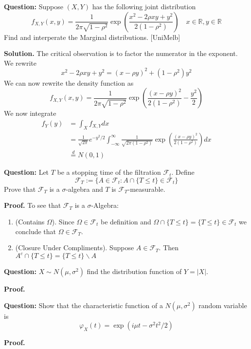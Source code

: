 \documentclass{article}
\begin{document}
\begin{tcolorbox}[colframe=black,colback=gray!5,boxrule=0.5pt]
\textbf{Question:} Suppose $(X,Y)$ has the following joint distribution
$$f_{X,Y}(x,y) = \frac{1}{2\pi\sqrt{1-\rho^2}}\exp\left(\frac{x^2 - 2\rho xy + y^2}{2(1-\rho^2)}\right)\quad x\in\mathbb{R},y\in\mathbb{R}$$
Find and interperate the Marginal distributions. [UniMelb]
\end{tcolorbox}
\textbf{Solution.} The critical observation is to factor the numerator in the exponent. We rewrite $$x^2 -2\rho xy + y^2 = (x-\rho y)^2 + (1-\rho^2)y^2$$
We can now rewrite the density function as
$$f_{X,Y}(x,y) = \frac{1}{2\pi\sqrt{1-\rho^2}}\exp\left(\frac{(x-\rho y)^2}{2(1-\rho^2)} - \frac{y^2}{2}\right)$$
We now integrate
\begin{align*}
    f_Y(y) &= \int_{X} f_{X,Y}dx \\
    &= \frac{1}{\sqrt{2\pi}}e^{-y^2/2}\int_{-\infty}^{\infty} \frac{1}{\sqrt{2\pi(1-\rho^2)}}\exp\left(\frac{(x-\rho y)^2}{2(1-\rho^2)}\right)dx \\
    &\stackrel{d}{=} N(0,1)
\end{align*} 

\begin{tcolorbox}[colframe=black,colback=gray!5,boxrule=0.5pt]
\textbf{Question:} Let $T$ be a stopping time of the filtration $\mathcal{F}_t$. Define 
$$\mathcal{F}_T := \{A\in\mathcal{F}_t : A\cap\{T\leq t\}\in\mathcal{F}_t\}$$
Prove that $\mathcal{F}_T$ is a $\sigma$-algebra and $T$ is $\mathcal{F}_T$-measurable.
\end{tcolorbox}
\textbf{Proof.} To see that $\mathcal{F}_T$ is a $\sigma$-Algebra: 
\begin{enumerate}
    \item (Contains $\Omega$). Since $\Omega\in\mathcal{F}_t$ be definition and $\Omega \cap\{T\leq t\} = \{T\leq t\}\in\mathcal{F}_t$ we conclude that $\Omega\in\mathcal{F}_T$. 
    \item (Closure Under Compliments). Suppose $A\in\mathcal{F}_T$. Then $A^c\cap\{T\leq t\} = \{T\leq t\}\backslash A $
\end{enumerate}

\begin{tcolorbox}[colframe=black,colback=gray!5,boxrule=0.5pt]
\textbf{Question:} $X\sim N(\mu,\sigma^2)$ find the distribution function of $Y = |X|.$
\end{tcolorbox}
\textbf{Proof.}


\begin{tcolorbox}[colframe=black,colback=gray!5,boxrule=0.5pt]
\textbf{Question:} Show that the characteristic function of a $N(\mu, \sigma^2)$ random variable is 
$$\varphi_X(t) = \exp(i\mu t - \sigma^2t^2/2)$$
\end{tcolorbox}
\textbf{Proof.}
\end{document}
